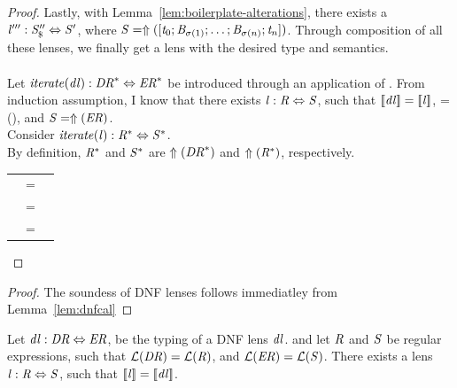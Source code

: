\documentclass[numbers]{sigplanconf}
\begin{document}
\begin{lemma}
\begin{proof}
    Lastly, with Lemma~\ref{lem:boilerplate-alterations}, there exists a
    $\mathit{l}''' : \mathit{S}_{\$}'' \Leftrightarrow \mathit{S}'$, where
    $\mathit{S} = \Uparrow([\mathit{t}_0; \mathit{B}_{\sigma(1)} ; \ldots ; \mathit{B}_{\sigma(n)} ; \mathit{t}_n])$.
    Through composition of all these lenses, we finally get a lens with the desired type
    and semantics.\\
    \\
    Let $\mathit{iterate(\mathit{dl})} : {\mathit{DR}}^* \Leftrightarrow {\ensuremath{\mathit{ER}}}^*$
    be introduced through an application of \IterateAtomLensRule{}.
    From induction assumption, I know that there exists $\mathit{l} : \mathit{R} \Leftrightarrow \mathit{S}$, such that
    $[ \! [\mathit{dl}] \! ]=[ \! [\mathit{l}] \! ]$,
    \Regex=\ToRegex(\DNFRegex), and
    $\mathit{S}=\Uparrow(\mathit{ER})$.\\
    Consider $\mathit{iterate(\mathit{l})} : {\mathit{R}}^* \Leftrightarrow {\ensuremath{\mathit{S}}}^*$.\\
    By definition, ${\mathit{R}}^*$ and ${\mathit{S}}^*$ are $\Uparrow({\mathit{DR}}^*)$
    and $\Uparrow({\mathit{R}}^*)$, respectively.

    \begin{tabular}{RcL}
      \SemanticsOf{\IterateLensOf{\Lens}} & = &
                                                \\
                                          & = &
                                                \\
                                          & = &
                                                \SemanticsOf{\IterateLensOf{\DNFLens}}
    \end{tabular}
  \end{proof}
\end{lemma}

\dnfls*
\begin{proof}

  The soundess of DNF lenses follows immediatley from Lemma~\ref{lem:dnfcal}

\end{proof}

\begin{theorem}
  Let $\mathit{dl} : \mathit{DR} \Leftrightarrow \mathit{ER}$, be the typing
  of a DNF lens $\mathit{dl}$.
  and let $\mathit{R}$ and $\mathit{S}$ be regular expressions, such that
  $\mathcal{L}(\mathit{DR})=\mathcal{L}(\mathit{R})$,
  and $\mathcal{L}(\mathit{ER})=\mathcal{L}(\mathit{S})$.
  There exists a lens $\mathit{l} : \mathit{R} \Leftrightarrow \mathit{S}$, such that
  $[ \! [\mathit{l}] \! ]=[ \! [\mathit{dl}] \! ]$.
\end{theorem}
\end{document}
